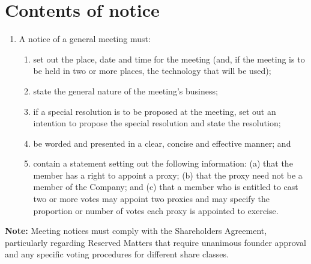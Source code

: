 \section{Contents of notice}

\begin{enumerate}[label=(\alph*)]
    \item A notice of a general meeting must:
    \begin{enumerate}[label=(\roman*)]
        \item set out the place, date and time for the meeting (and, if the meeting is to be held in two or more places, the technology that will be used);
        \item state the general nature of the meeting's business;
        \item if a special resolution is to be proposed at the meeting, set out an intention to propose the special resolution and state the resolution;
        \item be worded and presented in a clear, concise and effective manner; and
        \item contain a statement setting out the following information: (a) that the member has a right to appoint a proxy; (b) that the proxy need not be a member of the Company; and (c) that a member who is entitled to cast two or more votes may appoint two proxies and may specify the proportion or number of votes each proxy is appointed to exercise.
    \end{enumerate}
\end{enumerate}

\textbf{Note:} Meeting notices must comply with the Shareholders Agreement, particularly regarding Reserved Matters that require unanimous founder approval and any specific voting procedures for different share classes. 